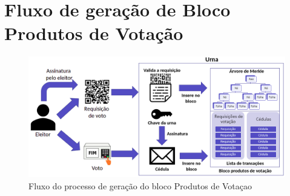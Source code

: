 \chapter{Fluxo de geração de Bloco Produtos de Votação}
\label{chapter:bloco}

\begin{figure}[h!]
	\centering
	\includegraphics[width=\textwidth]{imagens/fluxo_voto}
	\caption{Fluxo do processo de geração do bloco Produtos de Votaçao}
	\label{fig:fluxo_voto}
\end{figure}